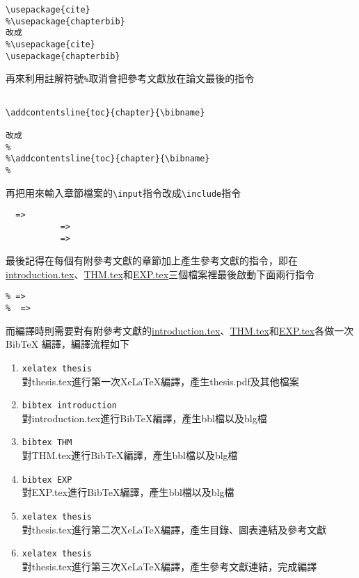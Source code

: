 \begin{enumerate}[leftmargin=0pt, topsep=0pt, itemsep=0pt, label=\Roman{*}.]
    \begin{verbatim}
\usepackage{cite}
%\usepackage{chapterbib}
改成
%\usepackage{cite}
\usepackage{chapterbib}
    \end{verbatim}
    再來利用註解符號\texttt{\%}取消會把參考文獻放在論文最後的指令
    \begin{verbatim}

\addcontentsline{toc}{chapter}{\bibname}

改成
%
%\addcontentsline{toc}{chapter}{\bibname}
%
    \end{verbatim}
    再把用來輸入章節檔案的\texttt{\textbackslash input}指令改成\texttt{\textbackslash include}指令
     \begin{verbatim}
  =>  
           =>  
           =>  
     \end{verbatim}
    最後記得在每個有附參考文獻的章節加上產生參考文獻的指令，即在\href{run:./introduction.tex}{introduction.tex}、\href{run:./THM.tex}{THM.tex}和\href{run:./EXP.tex}{EXP.tex}三個檔案裡最後啟動下面兩行指令
     \begin{verbatim}
% => 
%  =>  
     \end{verbatim}
    而編譯時則需要對有附參考文獻的\href{run:./introduction.tex}{introduction.tex}、\href{run:./THM.tex}{THM.tex}和\href{run:./EXP.tex}{EXP.tex}各做一次BibTeX 編譯，編譯流程如下
    \begin{enumerate}[topsep=0pt, itemsep=0pt, label=\arabic{*}.]
    \item \texttt{xelatex thesis}\\ 對thesis.tex進行第一次XeLaTeX編譯，產生thesis.pdf及其他檔案
    \item \texttt{bibtex introduction}\\ 對introduction.tex進行BibTeX編譯，產生bbl檔以及blg檔
    \item \texttt{bibtex THM}\\ 對THM.tex進行BibTeX編譯，產生bbl檔以及blg檔
    \item \texttt{bibtex EXP}\\ 對EXP.tex進行BibTeX編譯，產生bbl檔以及blg檔
    \item \texttt{xelatex thesis}\\ 對thesis.tex進行第二次XeLaTeX編譯，產生目錄、圖表連結及參考文獻
    \item \texttt{xelatex thesis}\\ 對thesis.tex進行第三次XeLaTeX編譯，產生參考文獻連結，完成編譯\\

\end{enumerate}
\end{enumerate}
